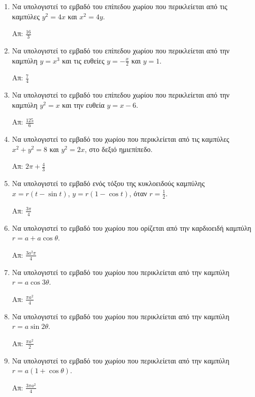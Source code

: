 


\everymath{\displaystyle}
\thispagestyle{empty}



\begin{center}
\end{center}

\vspace{\baselineskip}



\begin{enumerate}

	\item Να υπολογιστεί το εμβαδό του επίπεδου χωρίου που περικλείεται από τις καμπύλες 
		$ y^{2} = 4x $ και $ x^{2} = 4y $.

		\hfill Απ: $ \frac{16}{3} $

	\item Να υπολογιστεί το εμβαδό του επίπεδου χωρίου που περικλείεται από την καμπύλη  
		$ y = x^{3} $ και τις ευθείες $ y = -\frac{x}{2} $ και $ y=1 $.

		\hfill Απ: $ \frac{7}{4} $

	\item Να υπολογιστεί το εμβαδό του επίπεδου χωρίου που περικλείεται από την καμπύλη 
		$ y^{2} = x $ και την ευθεία $ y = x-6 $.

		\hfill Απ: $ \frac{125}{6} $

	\item Να υπολογιστεί το εμβαδό του χωρίου που περικλείεται από τις καμπύλες $
		x^{2} + y^{2} = 8 $ και $ y^{2} = 2x $, στο δεξιό ημιεπίπεδο.

		\hfill Απ: $ 2 \pi + \frac{4}{3} $

	\item Να υπολογιστεί το εμβαδό ενός τόξου της κυκλοειδούς καμπύλης $ x = r(t - \sin{t}) $, $
		y = r(1 - \cos{t}) $, όταν $ r = \frac{1}{2} $.

		\hfill Απ: $ \frac{3 \pi}{4} $

	\item Να υπολογιστεί το εμβαδό του χωρίου που ορίζεται από την καρδιοειδή καμπύλη
		$ r = a + a\cos{\theta} $.

		\hfill Απ: $ \frac{3a^{2}\pi}{4} $

	\item Να υπολογιστεί το εμβαδό του χωρίου που περικλείεται από την καμπύλη $
		r = a \cos{3\theta} $.

		\hfill Απ: $ \frac{\pi a^{2}}{4} $

	\item Να υπολογιστεί το εμβαδό του χωρίου που περικλείεται από την καμπύλη $
		r = a \sin{2\theta} $.

		\hfill Απ: $ \frac{\pi a^{2}}{2} $

	\item Να υπολογιστεί το εμβαδό του χωρίου που περικλείεται από την καμπύλη $
		r = a (1+\cos{\theta}) $.

		\hfill Απ: $ \frac{3\pi a^{2}}{4} $

\end{enumerate}





